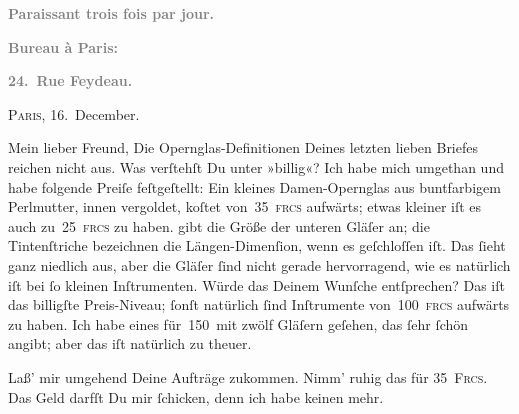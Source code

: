 \pstart
           \begin{otherlanguage}{french}\textcolor{gray}{\textbf{\textbf{Paraissant trois fois par jour.}}}\end{otherlanguage}\pend
           
\pstart
           \begin{otherlanguage}{french}\textcolor{gray}{\textbf{\textbf{Bureau à Paris:}}}\end{otherlanguage}\pend
           
\pstart
           \begin{otherlanguage}{french}\textcolor{gray}{\textbf{\textbf{24. Rue Feydeau.}}}\end{otherlanguage}\hfill \textsc{Paris}, 16. December.\pend
           
\pstart\center{}Mein lieber Freund,\pend\vspace{0.5em}
\pstart
           Die Opernglas-Definitionen Deines letzten lieben Briefes reichen nicht aus. Was
               verſtehſt Du unter »billig«? Ich habe mich umgethan\strikeout{,}
               und habe folgende Preiſe feſtgeſtellt: Ein kleines Damen-Opernglas aus buntfarbigem
               Perlmutter, innen vergoldet, koſtet von 35 \textsc{frcs} aufwärts;
               etwas kleiner iſt es auch zu 25 \textsc{frcs} zu haben. \label{K_L02759-1v}\label{K_L02759-1} gibt die
               Größe der unteren Gläſer an; die {\pb}Tintenſtriche
               bezeichnen die Längen-Dimenſion, wenn es geſchloſſen iſt. Das{ }ſieht ganz niedlich
               aus, aber die Gläſer{ }ſind nicht gerade hervorragend, wie es natürlich iſt bei{ }ſo
               kleinen Inſtrumenten. Würde das Deinem Wunſche entſprechen? Das iſt das billigſte
               Preis-Niveau;{ }ſonſt natürlich{ }ſind Inſtrumente von 100 \textsc{frcs}
               aufwärts zu haben. Ich habe eines für 150 mit zwölf Gläſern geſehen, das{ }ſehr{ }ſchön
               angibt; aber das iſt {\pb}natürlich zu theuer.\pend
           
\pstart
           Laß’ mir umgehend Deine Aufträge zukommen. Nimm’ ruhig das für \textsc{35 Frcs}. Das Geld darfſt Du mir{ }ſchicken, denn ich habe keinen \label{K_L02759-2v}\label{K_L02759-2} mehr.\pend
           
